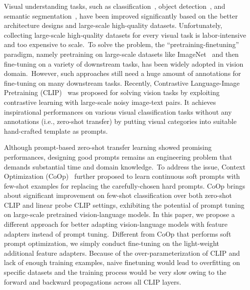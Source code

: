 \documentclass[default,iicol]{sn-jnl}%
\theoremstyle{thmstyleone}%
\theoremstyle{thmstyletwo}%
\theoremstyle{thmstylethree}%
\begin{document}
Visual understanding tasks, such as classification~\cite{krizhevsky2012imagenet,he2016deep,howard2017mobilenets,dosovitskiy2021vit,touvron2021training,gao2021container,mao2021dual}, object detection~\cite{ren2015faster,carion2020end,gao2021fast}, and semantic  segmentation~\cite{long2015fully}, have been improved significantly based on the better architecture designs and large-scale high-quality datasets. Unfortunately, collecting large-scale high-quality datasets for every visual task is labor-intensive and too expensive to scale.~To solve the problem, the ``pretraining-finetuning'' paradigm, namely pretraining on large-scale datasets like ImageNet~\cite{krizhevsky2012imagenet} and then fine-tuning on a variety of downstream tasks, has been widely adopted in vision domain.~However, such approaches still need a huge amount of annotations for fine-tuning on many downstream tasks. Recently, Contrastive Language-Image Pretraining (CLIP)~\cite{radford2021learning} was proposed for solving vision tasks by exploiting contrastive learning with large-scale noisy image-text pairs. It achieves inspirational performances on various visual classification tasks without any annotations (i.e., zero-shot transfer) by putting visual categories into suitable hand-crafted template as prompts.

Although prompt-based zero-shot transfer learning showed promising performances, designing good prompts remains an engineering problem that demands substantial time and domain knowledge.~To address the issue, Context Optimization (CoOp)~\cite{zhou2021coop} further proposed to learn continuous soft prompts with few-shot examples for replacing the carefully-chosen hard prompts. CoOp brings about significant improvement on few-shot classification over both zero-shot CLIP and linear probe CLIP settings, exhibiting the potential of prompt tuning on large-scale pretrained vision-language models. 
In this paper, we propose a different approach for better adapting vision-language models with feature adapters instead of prompt tuning.~Different from CoOp that performs soft prompt optimization, we simply conduct fine-tuning on the light-weight additional feature adapters. Because of the over-parameterization of CLIP and lack of enough training examples, naive finetuning would lead to overfitting on specific datasets and the training process would be very slow owing to the forward and backward propagations across all CLIP layers. 
\end{document}
